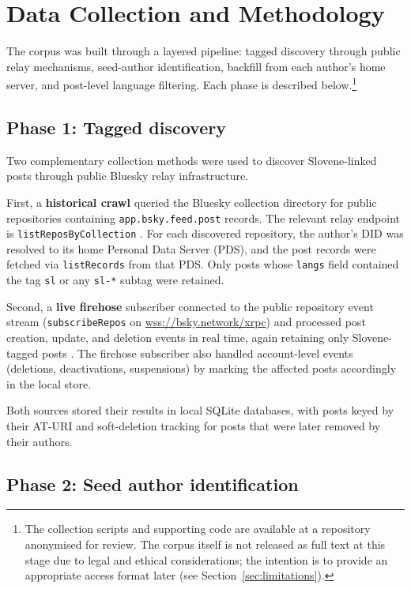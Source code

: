 \section{Data Collection and Methodology}
\label{sec:corpus-construction}

The corpus was built through a layered pipeline: tagged discovery through public relay mechanisms, seed-author identification, backfill from each author's home server, and post-level language filtering. Each phase is described below.\footnote{The collection scripts and supporting code are available at a repository anonymised for review. The corpus itself is not released as full text at this stage due to legal and ethical considerations; the intention is to provide an appropriate access format later (see Section~\ref{sec:limitations}).}

\subsection{Phase 1: Tagged discovery}

Two complementary collection methods were used to discover Slovene-linked posts through public Bluesky relay infrastructure.

First, a \textbf{historical crawl} queried the Bluesky collection directory for public repositories containing \texttt{app.bsky.feed.post} records. The relevant relay endpoint is \texttt{listReposByCollection} \parencite{atproto-sync,bsky-listreposbycollection}. For each discovered repository, the author's DID was resolved to its home Personal Data Server (PDS), and the post records were fetched via \texttt{listRecords} from that PDS. Only posts whose \texttt{langs} field contained the tag \texttt{sl} or any \texttt{sl-*} subtag were retained.

Second, a \textbf{live firehose} subscriber connected to the public repository event stream (\texttt{subscribeRepos} on \url{wss://bsky.network/xrpc}) and processed post creation, update, and deletion events in real time, again retaining only Slovene-tagged posts \parencite{atproto-streaming}. The firehose subscriber also handled account-level events (deletions, deactivations, suspensions) by marking the affected posts accordingly in the local store.

Both sources stored their results in local SQLite databases, with posts keyed by their AT-URI and soft-deletion tracking for posts that were later removed by their authors.

\subsection{Phase 2: Seed author identification}

